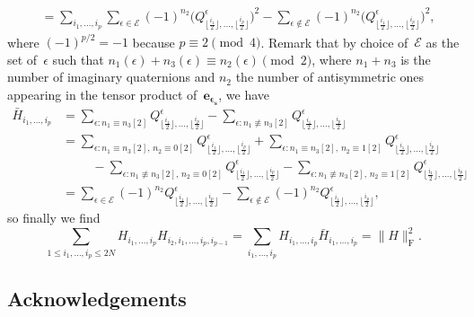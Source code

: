 \documentclass[pdftex]{sigma}
\numberwithin{equation}{section}
\theoremstyle{definition}
\begin{document}
\begin{itemize}
\begin{align*}
    &= \sum_{i_1,\dots,i_{p} } \sum_{\epsilon \in \mathcal{E}} (-1)^{n_2}  \bigl(Q^{\epsilon}_{\lfloor \frac{i_{1}}{2} \rfloor,\dots,\lfloor \frac{i_{p}}{2} \rfloor}\bigr)^2 -  \sum_{\epsilon \notin \mathcal{E}} (-1)^{n_2} \bigl(Q^{\epsilon}_{\lfloor \frac{i_{1}}{2} \rfloor,\dots,\lfloor \frac{i_{p}}{2} \rfloor}\bigr)^2,
\end{align*}
where $(-1)^{p/2}=-1$ because $p \equiv 2 \pmod 4$. Remark that by choice of~$\mathcal{E}$ as the set of~$\epsilon$ such that $n_1(\epsilon)+n_3(\epsilon)\equiv n_2(\epsilon) \pmod 2$, where $n_1+n_3$ is the number of imaginary quaternions and $n_2$ the number of antisymmetric ones appearing in the tensor product of~$\mathbf{e_{\epsilon_s}}$, we have
\begin{align*}
    \bar H_{i_1,\dots,i_p} &= \sum_{\epsilon\colon n_1 \equiv n_3 [2]} Q^{\epsilon}_{\lfloor \frac{i_{1}}{2} \rfloor,\dots,\lfloor \frac{i_{p}}{2} \rfloor} - \sum_{\epsilon\colon n_1 \not\equiv n_3[2]}  Q^{\epsilon}_{\lfloor \frac{i_{1}}{2} \rfloor,\dots,\lfloor \frac{i_{p}}{2} \rfloor} \\
    & = \sum_{\epsilon\colon  n_1 \equiv n_3[2],\, n_2\equiv 0[2]} Q_{\lfloor \frac{i_{1}}{2} \rfloor,\dots,\lfloor \frac{i_{p}}{2} \rfloor}^{\epsilon} + \sum_{\epsilon\colon n_1 \equiv n_3[2],\, n_2 \equiv 1[2]} Q_{\lfloor \frac{i_{1}}{2} \rfloor,\dots,\lfloor \frac{i_{p}}{2} \rfloor}^{\epsilon} \\
    & \hspace{1cm} - \sum_{\epsilon\colon n_1 \not\equiv n_3[2],\, n_2\equiv 0[2]} Q_{\lfloor \frac{i_{1}}{2} \rfloor,\dots,\lfloor \frac{i_{p}}{2} \rfloor}^{\epsilon} - \sum_{\epsilon\colon n_1 \not\equiv n_3 [2],\, n_2 \equiv 1[2]} Q_{\lfloor \frac{i_{1}}{2} \rfloor,\dots,\lfloor \frac{i_{p}}{2} \rfloor}^{\epsilon} \\
    & =\sum_{\epsilon \in \mathcal{E}} (-1)^{n_2} Q_{\lfloor \frac{i_{1}}{2} \rfloor,\dots,\lfloor \frac{i_{p}}{2} \rfloor}^{\epsilon} - \sum_{\epsilon \notin \mathcal{E}} (-1)^{n_2} Q_{\lfloor \frac{i_{1}}{2} \rfloor,\dots,\lfloor \frac{i_{p}}{2} \rfloor}^{\epsilon},
\end{align*}
so finally we find
\[ \sum_{1\leq i_1,\dots,i_{p}\leq 2N}  H_{i_1,\dots,i_p} H_{i_2,i_1,\dots,i_p,i_{p-1}}= \sum_{i_1,\dots,i_{p}} H_{i_1,\dots,i_p} \bar H_{i_1,\dots,i_p} = \| H \|_{\mathrm{F}}^2. \]
\end{itemize}

\subsection*{Acknowledgements}
\end{document}
